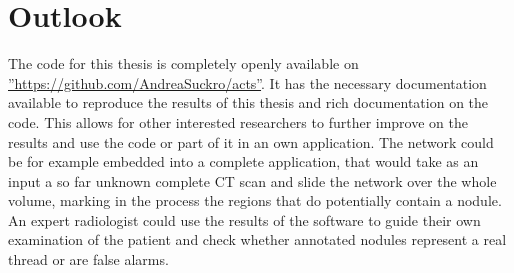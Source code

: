 \documentclass[main.tex]{subfiles}
\begin{document}
\section{Outlook}
The code for this thesis is completely openly available on \hyperref[GitHub]{''https://github.com/AndreaSuckro/acts''}. It has the necessary documentation available to reproduce the results of this thesis and rich documentation on the code. This allows for other interested researchers to further improve on the results and use the code or part of it in an own application. The network could be for example embedded into a complete application, that would take as an input a so far unknown complete CT scan and slide the network over the whole volume, marking in the process the regions that do potentially contain a nodule. An expert radiologist could use the results of the software to guide their own examination of the patient and check whether annotated nodules represent a real thread or are false alarms.


\end{document}
